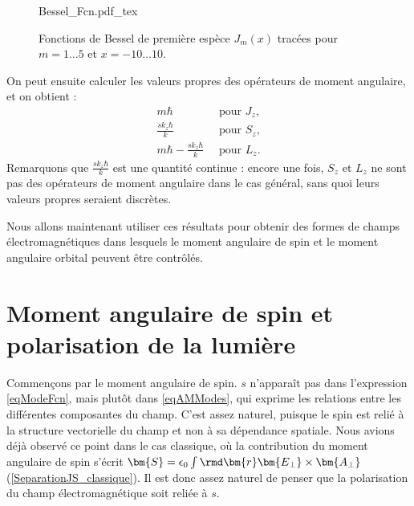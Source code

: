 \begin{figure}[!ht]
\centering
\def\svgwidth{0.8\columnwidth}
{Bessel_Fcn.pdf_tex}
\caption{Fonctions de Bessel de première espèce $J_m(x)$ tracées pour $m=1\ldots5$ et $x=-10\ldots10$.}
\label{Fig:BesselFcn}
\end{figure}

On peut ensuite calculer les valeurs propres des opérateurs de moment angulaire, et on obtient :
\begin{equation}
\begin{alignedat}{1}
m\hbar ~&\mbox{ pour } J_z\mbox{,}\\
\frac{sk_z\hbar}{k} ~&\mbox{ pour } S_z\mbox{,}\\
m\hbar-\frac{sk_z\hbar}{k} ~&\mbox{ pour } L_z\mbox{.}
\end{alignedat}
\label{eq.VP_AM}
\end{equation}
Remarquons que $\frac{sk_z\hbar}{k}$ est une quantité continue : encore une fois, $S_z$ et $L_z$ ne sont pas des opérateurs de moment angulaire dans le cas général, sans quoi leurs valeurs propres seraient discrètes. 


Nous allons maintenant utiliser ces résultats pour obtenir des formes de champs électromagnétiques dans lesquels le moment angulaire de spin et le moment angulaire orbital peuvent être contrôlés.

\section{Moment angulaire de spin et polarisation de la lumière}
Commençons par le moment angulaire de spin. $s$ n'apparaît pas dans l'expression \ref{eqModeFcn}, mais plutôt dans \ref{eqAMModes}, qui exprime les relations entre les différentes composantes du champ. C'est assez naturel, puisque le spin est relié à la structure vectorielle du champ et non à sa dépendance spatiale. Nous avions déjà observé ce point dans le cas classique, où la contribution du moment angulaire de spin s'écrit $\bm{S}=\epsilon_0\int{\rmd\bm{r}\bm{E_{\bot}}\times\bm{A_{\bot}}}$ (\ref{SeparationJS_classique}). Il est donc assez naturel de penser que la polarisation du champ électromagnétique soit reliée à $s$.

